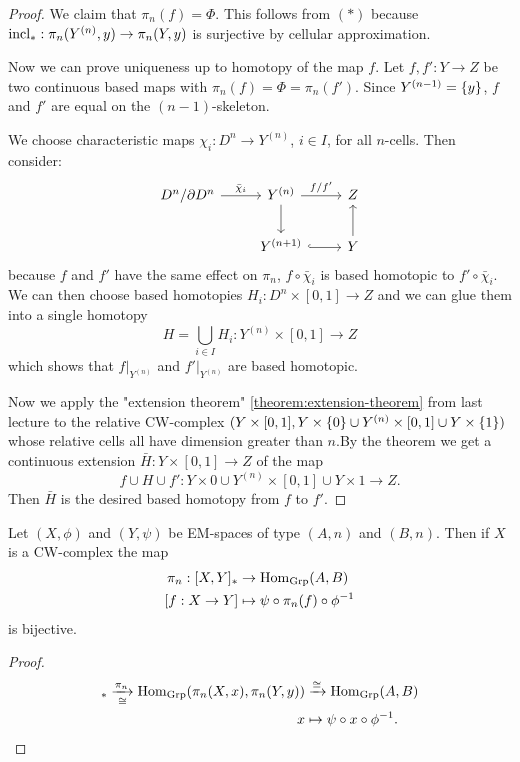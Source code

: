 \begin{proof}
We claim that $\pi_n(f)=\Phi$. This follows from $(*)$ because $\operatorname{incl}_*:\pi_n(Y^{(n)},y)\to\pi_n(Y,y)$ is surjective by cellular approximation.

Now we can prove uniqueness up to homotopy of the map $f$. Let $f,f':Y\to Z$ be two continuous based maps with $\pi_n(f)=\Phi=\pi_n(f')$. Since $Y^{({n-1})}=\{y\}$, $f$ and $f'$ are equal on the $(n-1)$-skeleton.

We choose characteristic maps $\chi_i:D^n\to Y^{(n)}$, $i\in I$, for all $n$-cells. Then consider:
\[
\begin{tikzcd}
D^n/\de D^n \ar[r,"\bar\chi_i"] & Y^{(n)} \ar[d] \ar[r,"f/f'"] & Z\\
& Y^{(n+1)} \ar[r,hook] & Y \ar[u]
\end{tikzcd}
\]
because $f$ and $f'$ have the same effect on $\pi_n$, $f\circ\bar\chi_i$ is based homotopic to $f'\circ\bar\chi_i$. We can then choose based homotopies $H_i:D^n\times[0,1]\to Z$ and we can glue them into a single homotopy
\[H=\bigcup_{i\in I}H_i:Y^{(n)}\times[0,1]\to Z\]
which shows that $f|_{Y^{(n)}}$ and $f'|_{Y^{(n)}}$ are based homotopic.

Now we apply the "extension theorem" \ref{theorem:extension-theorem} from last lecture to the relative CW-complex $(Y\times[0,1],Y\times\{0\}\cup Y^{(n)}\times[0,1]\cup Y\times\{1\})$ whose relative cells all have dimension greater than $n$.By the theorem we get a continuous extension $\bar H:Y\times[0,1]\to Z$ of the map
\[f\cup H\cup f':Y\times0\cup Y^{(n)}\times[0,1]\cup Y\times1\to Z.\]
Then $\bar H$ is the desired based homotopy from $f$ to $f'$.
\end{proof}

\begin{theorem}
Let $(X,\phi)$ and $(Y,\psi)$ be EM-spaces of type $(A,n)$ and $(B,n)$. Then if $X$ is a CW-complex the map
\begin{align*}
    \pi_n:[X,Y]_*&\to\Hom_\Grp(A,B)\\
    [f:X\to Y]&\mapsto\psi\circ\pi_n(f)\circ\phi^\inv
\end{align*}
is bijective.
\end{theorem}

\begin{proof}
\begin{align*}
    [X,Y]_*\underset{\cong}{\xto{\pi_n}}\Hom_\Grp(\pi_n(X,x),\pi_n(Y,y))&\xto{\cong}\Hom_\Grp(A,B)\\
    x&\mapsto\psi\circ x\circ\phi^\inv.
\end{align*}
\end{proof}

